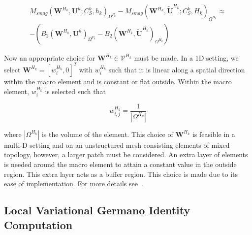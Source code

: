 \begin{equation}
	\label{eq:vgilb}
\begin{split}
M_{smag}(\bm{W}^{H_k},\bm{U}^{h}; C_S^k, h_k)_{\Omega^{P_k}} - M_{smag}(\bm{W}^{H_k},\widetilde{\bm{U}}^{H_k} ; C_S^k, H_k)_{\Omega^{H_k}} \approx\\
-(B_2(\bm{W}^{H_k},\bm{U}^{h})_{\Omega^{P_k}} - B_2(\bm{W}^{H_k},\widetilde{\bm{U}}^{H_k})_{\Omega^{H_k}} )
\end{split}
\end{equation}

Now an appropriate choice for $\bm{W}^{H_k} \in \bm{\mathcal{V}}^{H_k}$ must be made. 
In a 1D setting, we select
$\bm{W}^{H_k}=[w^{H_k}_i,0]^T$ with $w^{H_k}_i$
such that it is linear along a spatial direction within the
macro element and is constant or flat outside.
Within the macro element, $w^{H_k}_i$ is selected such that

\begin{equation}
\label{eq:wij}
w^{H_k}_{i,j} = \frac{1}{|\Omega^{H_k}|}
\end{equation}

\noindent where $|\Omega^{H_k}|$ is the volume of the
element. 
This choice of $\bm{W}^{H_k}$
is feasible in a multi-D setting and on an
unstructured mesh consisting elements of mixed topology,
however, a larger patch must be considered. An extra layer
of elements is needed around the macro element to attain a constant value
in the outside region. This extra layer acts as a buffer region.
This choice is made due to its ease of implementation.
For more details see~\cite{bib:tran2017b}.


\subsection{Local Variational Germano Identity Computation}
\label{sec:VGIComp}

